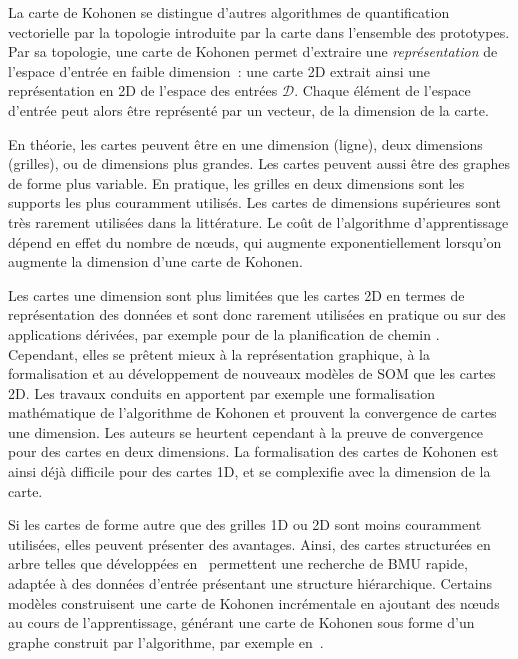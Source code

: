 \documentclass[../main]{subfiles}
\begin{document}
La carte de Kohonen se distingue d'autres algorithmes de quantification vectorielle par la topologie introduite par la carte dans l'ensemble des prototypes.
Par sa topologie, une carte de Kohonen permet d'extraire une \emph{représentation} de l'espace d'entrée en faible dimension~: une carte 2D extrait ainsi une représentation en 2D de l'espace des entrées $\mathcal{D}$.
Chaque élément de l'espace d'entrée peut alors être représenté par un vecteur, de la dimension de la carte.

En théorie, les cartes peuvent être en une dimension (ligne), deux dimensions (grilles), ou de dimensions plus grandes. Les cartes peuvent aussi être des graphes de forme plus variable. 
En pratique, les grilles en deux dimensions sont les supports les plus couramment utilisés. Les cartes de dimensions supérieures sont très rarement utilisées dans la littérature. 
Le coût de l'algorithme d'apprentissage dépend en effet du nombre de n\oe{}uds, qui augmente exponentiellement lorsqu'on augmente la dimension d'une carte de Kohonen.

Les cartes une dimension sont plus limitées que les cartes 2D en termes de représentation des données et sont donc rarement utilisées en pratique ou sur des applications dérivées, par exemple pour de la planification de chemin \parencite{FrezzaBuet2020SelforganizingMI}.
Cependant, elles se prêtent mieux à la représentation graphique, à la formalisation et au développement de nouveaux modèles de SOM que les cartes 2D.
Les travaux conduits en \cite{Cottrell1998TheoreticalAO, fort_soms_2006, cottrell_theoretical_2016} apportent par exemple une formalisation mathématique de l'algorithme de Kohonen et prouvent la convergence de cartes une dimension. Les auteurs se heurtent cependant à la preuve de convergence pour des cartes en deux dimensions.
La formalisation des cartes de Kohonen est ainsi déjà difficile pour des cartes 1D, et se complexifie avec la dimension de la carte.

Si les cartes de forme autre que des grilles 1D ou 2D sont moins couramment utilisées, elles peuvent présenter des avantages. Ainsi, des cartes structurées en arbre telles que développées en~\cite{koikkalainen_self-organizing_1990} permettent une recherche de BMU rapide, adaptée à des données d'entrée présentant une structure hiérarchique. Certains modèles construisent une carte de Kohonen incrémentale en ajoutant des n\oe{}uds au cours de l'apprentissage, générant une carte de Kohonen sous forme d'un graphe construit par l'algorithme, par exemple en~\cite{Fritzke1995GrowingG, alahakoon_dynamic_2000, yamaguchi_adaptive_2010}.
\end{document}
